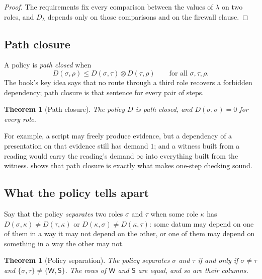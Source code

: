 \documentclass[11pt]{article}
\numberwithin{equation}{section}
\theoremstyle{definition}
\theoremstyle{plain}
\newtheorem{theorem}[definition]{Theorem}
\theoremstyle{remark}
\newcommand{\Wit}{\mathsf W}
\newcommand{\Scr}{\mathsf S}
\newcommand{\absent}{\boldsymbol\infty}
\begin{document}
\begin{proof}
The requirements fix every comparison between the values of \(\lambda\) on
two roles, and \(D_\lambda\) depends only on those comparisons and on the
firewall clause.
\end{proof}

\subsection{Path closure}

A policy is \emph{path closed} when
\begin{equation}\label{eq:path-closure}
  D(\sigma,\rho)\le D(\sigma,\tau)\otimes D(\tau,\rho)
  \qquad\text{for all }\sigma,\tau,\rho.
\end{equation}
The book's key idea says that no route through a third role recovers a
forbidden dependency; path closure is that sentence for every pair of steps.

\begin{theorem}[Path closure]\label{thm:path-closed}
The policy \(D\) is path closed, and \(D(\sigma,\sigma)=0\) for every role.
\end{theorem}

For example, a script may freely produce evidence, but a dependency of a
presentation on that evidence still has demand \(1\); and a witness built
from a reading would carry the reading's demand \(\absent\) into everything
built from the witness.   shows that path closure is
exactly what makes one-step checking sound.

\subsection{What the policy tells apart}\label{sec:policy-separation}

Say that the policy \emph{separates} two roles \(\sigma\) and \(\tau\) when
some role \(\kappa\) has \(D(\sigma,\kappa)\ne D(\tau,\kappa)\) or
\(D(\kappa,\sigma)\ne D(\kappa,\tau)\): some datum may depend on one of them
in a way it may not depend on the other, or one of them may depend on
something in a way the other may not.

\begin{theorem}[Policy separation]\label{thm:policy-separation}
The policy separates \(\sigma\) and \(\tau\) if and only if
\(\sigma\ne\tau\) and \(\{\sigma,\tau\}\ne\{\Wit,\Scr\}\).  The rows of
\(\Wit\) and \(\Scr\) are equal, and so are their columns.
\end{theorem}
\end{document}

